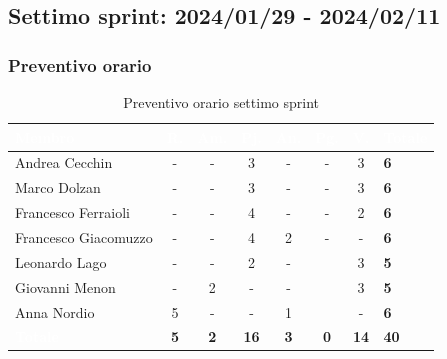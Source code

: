 \newpage

\subsection{Settimo sprint: 2024/01/29 - 2024/02/11}
\subsubsection{Preventivo orario}
{
\setlength{\tabcolsep}{10pt}
\renewcommand{\arraystretch}{1.5}
\begin{table}[h!]
    \centering
    \begin{tabularx}{\textwidth}{| l | c | c | c | c | c | c | X |}
        \hline
        \rowcolor{headerrow} \textbf{\textcolor{white}{Membro}} & \textbf{\textcolor{white}{R.}} & \textbf{\textcolor{white}{Am.}} & \textbf{\textcolor{white}{Pj.}} & \textbf{\textcolor{white}{An.}} & \textbf{\textcolor{white}{Pg.}} & \textbf{\textcolor{white}{V.}} & \textbf{\textcolor{white}{Totale}} \\
        \hline
        Andrea Cecchin & - & - & 3 & - & - & 3 & \textbf{6} \\
        \hline
        Marco Dolzan & - & - & 3 & - & - & 3 & \textbf{6} \\
        \hline
        Francesco Ferraioli & - & - & 4 & - & - & 2 & \textbf{6} \\
        \hline  
        Francesco Giacomuzzo & - & - & 4 & 2 & - & - & \textbf{6} \\
        \hline
        Leonardo Lago & - & - & 2 & - &  & 3 & \textbf{5} \\
        \hline
        Giovanni Menon & - & 2 & - & - &  & 3 & \textbf{5} \\
        \hline
        Anna Nordio & 5 & - & - & 1 &  & - & \textbf{6} \\
        \hline
    \cellcolor{headerrow} \textbf{\textcolor{white}{Totale}} & \textbf{5} & \textbf{2} & \textbf{16} & \textbf{3} & \textbf{0} & \textbf{14} & \textbf{40} \\
        \hline
    \end{tabularx} 
    \caption{Preventivo orario settimo sprint}
    \label{tab:preventivoorariosettimosprint}
\end{table}
}

